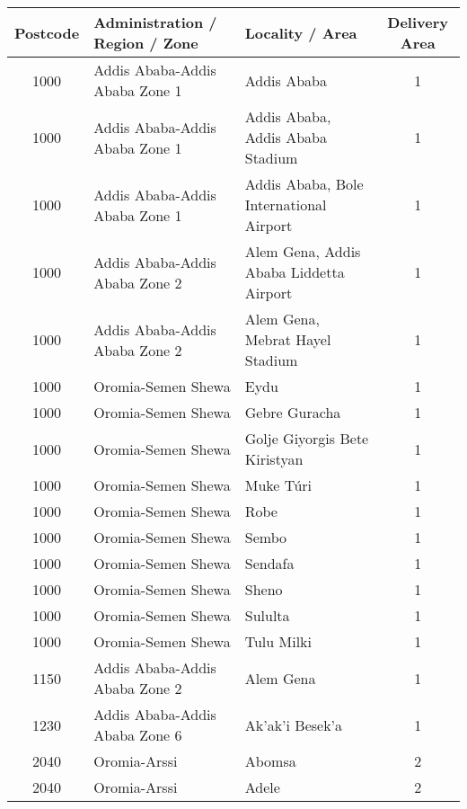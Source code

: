 \documentclass[12pt,a4paper]{report}
\begin{document}
\begin{tabular}{|c|l|l|c|}
\hline 
\rule[-1ex]{0pt}{2.5ex} Postcode & Administration / Region / Zone & Locality / Area & Delivery Area \\ 
\hline 
\rule[-1ex]{0pt}{2.5ex} 1000 & Addis Ababa-Addis Ababa Zone 1 & Addis Ababa & 1 \\
\hline 
\rule[-1ex]{0pt}{2.5ex} 1000 & Addis Ababa-Addis Ababa Zone 1 & Addis Ababa, Addis Ababa Stadium & 1 \\ 
\hline 
\rule[-1ex]{0pt}{2.5ex} 1000 & Addis Ababa-Addis Ababa Zone 1 & Addis Ababa, Bole International Airport & 1 \\ 
\hline 
\rule[-1ex]{0pt}{2.5ex} 1000 & Addis Ababa-Addis Ababa Zone 2 & Alem Gena, Addis Ababa Liddetta Airport & 1 \\ 
\hline 
\rule[-1ex]{0pt}{2.5ex} 1000 & Addis Ababa-Addis Ababa Zone 2 & Alem Gena, Mebrat Hayel Stadium & 1 \\
\hline 
\rule[-1ex]{0pt}{2.5ex} 1000 & Oromia-Semen Shewa & Eydu & 1 \\ 
\hline 
\rule[-1ex]{0pt}{2.5ex} 1000 & Oromia-Semen Shewa & Gebre Guracha & 1 \\ 
\hline 
\rule[-1ex]{0pt}{2.5ex} 1000 & Oromia-Semen Shewa & Golje Giyorgis Bete Kiristyan & 1 \\ 
\hline 
\rule[-1ex]{0pt}{2.5ex} 1000 & Oromia-Semen Shewa & Muke T\'uri & 1 \\ 
\hline 
\rule[-1ex]{0pt}{2.5ex} 1000 & Oromia-Semen Shewa & Robe & 1 \\ 
\hline 
\rule[-1ex]{0pt}{2.5ex} 1000 & Oromia-Semen Shewa & Sembo & 1 \\ 
\hline 
\rule[-1ex]{0pt}{2.5ex} 1000 & Oromia-Semen Shewa & Sendafa & 1 \\ 
\hline 
\rule[-1ex]{0pt}{2.5ex} 1000 & Oromia-Semen Shewa & Sheno & 1 \\ 
\hline 
\rule[-1ex]{0pt}{2.5ex} 1000 & Oromia-Semen Shewa & Sululta & 1 \\ 
\hline 
\rule[-1ex]{0pt}{2.5ex} 1000 & Oromia-Semen Shewa & Tulu Milki & 1 \\ 
\hline 
\rule[-1ex]{0pt}{2.5ex} 1150 & Addis Ababa-Addis Ababa Zone 2 & Alem Gena & 1 \\ 
\hline 
\rule[-1ex]{0pt}{2.5ex} 1230 & Addis Ababa-Addis Ababa Zone 6 & Ak'ak'i Besek'a & 1 \\ 
\hline 
\rule[-1ex]{0pt}{2.5ex} 2040 & Oromia-Arssi & Abomsa & 2 \\ 
\hline 
\rule[-1ex]{0pt}{2.5ex} 2040 & Oromia-Arssi & Adele & 2 \\ 

\end{tabular}
\end{document}
